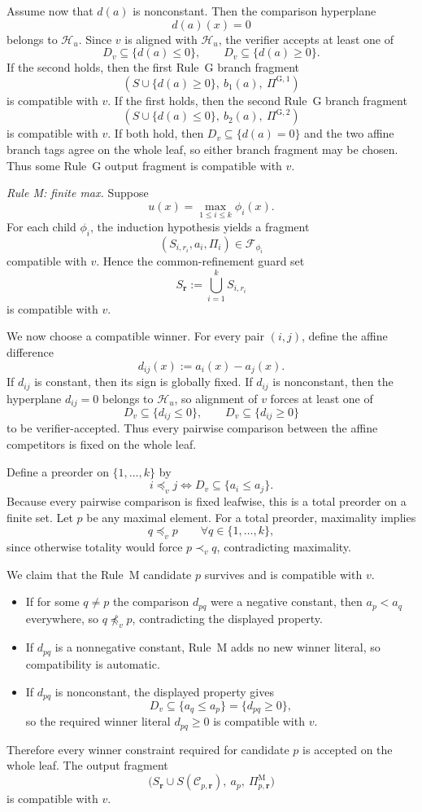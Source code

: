Assume now that $d(a)$ is nonconstant. Then the comparison hyperplane
\[
 d(a)(x)=0
\]
belongs to $\mathcal H_u$. Since $v$ is aligned with $\mathcal H_u$, the verifier accepts at least one of
\[
 D_v\subseteq\{d(a)\le 0\},
 \qquad
 D_v\subseteq\{d(a)\ge 0\}.
\]
If the second holds, then the first Rule~G branch fragment
\[
 (S\cup\{d(a)\ge 0\},\ b_1(a),\ \Pi^{\mathrm G,1})
\]
is compatible with $v$. If the first holds, then the second Rule~G branch fragment
\[
 (S\cup\{d(a)\le 0\},\ b_2(a),\ \Pi^{\mathrm G,2})
\]
is compatible with $v$. If both hold, then $D_v\subseteq\{d(a)=0\}$ and the two affine branch tags agree on the whole leaf, so either branch fragment may be chosen. Thus some Rule~G output fragment is compatible with $v$.

\emph{Rule M: finite max.}
Suppose
\[
 u(x)=\max_{1\le i\le k}\phi_i(x).
\]
For each child $\phi_i$, the induction hypothesis yields a fragment
\[
 (S_{i,r_i},a_i,\Pi_i)\in\mathcal F_{\phi_i}
\]
compatible with $v$. Hence the common-refinement guard set
\[
 S_{\mathbf r}:=\bigcup_{i=1}^k S_{i,r_i}
\]
is compatible with $v$.

We now choose a compatible winner. For every pair $(i,j)$, define the affine difference
\[
 d_{ij}(x):=a_i(x)-a_j(x).
\]
If $d_{ij}$ is constant, then its sign is globally fixed. If $d_{ij}$ is nonconstant, then the hyperplane $d_{ij}=0$ belongs to $\mathcal H_u$, so alignment of $v$ forces at least one of
\[
 D_v\subseteq\{d_{ij}\le 0\},
 \qquad
 D_v\subseteq\{d_{ij}\ge 0\}
\]
to be verifier-accepted. Thus every pairwise comparison between the affine competitors is fixed on the whole leaf.

Define a preorder on $\{1,\dots,k\}$ by
\[
 i\preceq_v j
 \iff
 D_v\subseteq\{a_i\le a_j\}.
\]
Because every pairwise comparison is fixed leafwise, this is a total preorder on a finite set. Let $p$ be any maximal element. For a total preorder, maximality implies
\[
 q\preceq_v p
 \qquad \forall q\in\{1,\dots,k\},
\]
since otherwise totality would force $p\prec_v q$, contradicting maximality.

We claim that the Rule~M candidate $p$ survives and is compatible with $v$.
\begin{itemize}
    \item If for some $q\neq p$ the comparison $d_{pq}$ were a negative constant, then $a_p<a_q$ everywhere, so $q\not\preceq_v p$, contradicting the displayed property.
    \item If $d_{pq}$ is a nonnegative constant, Rule~M adds no new winner literal, so compatibility is automatic.
    \item If $d_{pq}$ is nonconstant, the displayed property gives
    \[
    D_v\subseteq\{a_q\le a_p\}=\{d_{pq}\ge 0\},
    \]
    so the required winner literal $d_{pq}\ge 0$ is compatible with $v$.
\end{itemize}
Therefore every winner constraint required for candidate $p$ is accepted on the whole leaf. The output fragment
\[
 \bigl(S_{\mathbf r}\cup S(\mathcal C_{p,\mathbf r}),\ a_p,\ \Pi^{\mathrm M}_{p,\mathbf r}\bigr)
\]
is compatible with $v$.

